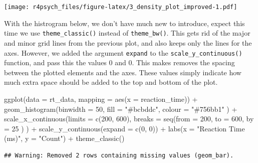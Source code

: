 \documentclass[
]{book}
\newenvironment{Shaded}{\begin{snugshade}}{\end{snugshade}}
\newcommand{\AttributeTok}[1]{\textcolor[rgb]{0.77,0.63,0.00}{#1}}
\newcommand{\DecValTok}[1]{\textcolor[rgb]{0.00,0.00,0.81}{#1}}
\newcommand{\FunctionTok}[1]{\textcolor[rgb]{0.00,0.00,0.00}{#1}}
\newcommand{\NormalTok}[1]{#1}
\newcommand{\SpecialCharTok}[1]{\textcolor[rgb]{0.00,0.00,0.00}{#1}}
\newcommand{\StringTok}[1]{\textcolor[rgb]{0.31,0.60,0.02}{#1}}
\begin{document}
\texttt{[image: r4psych\_files/figure-latex/3\_density\_plot\_improved-1.pdf]}

With the histrogram below, we don't have much new to introduce, expect this time we use \texttt{theme\_classic()} instead of \texttt{theme\_bw()}. This gets rid of the major and minor grid lines from the previous plot, and also keeps only the lines for the axes. However, we added the argument \texttt{expand} to the \texttt{scale\_y\_continuous()} function, and pass this the values 0 and 0. This makes removes the spacing between the plotted elements and the axes. These values simply indicate how much extra space should be added to the top and bottom of the plot.

\begin{Shaded}
\begin{Highlighting}[]
\FunctionTok{ggplot}\NormalTok{(}\AttributeTok{data =}\NormalTok{ rt\_data, }
       \AttributeTok{mapping =} \FunctionTok{aes}\NormalTok{(}\AttributeTok{x =}\NormalTok{ reaction\_time)) }\SpecialCharTok{+}
  \FunctionTok{geom\_histogram}\NormalTok{(}\AttributeTok{binwidth =} \DecValTok{50}\NormalTok{, }
                 \AttributeTok{fill =} \StringTok{"\#bcbddc"}\NormalTok{,}
                 \AttributeTok{colour =} \StringTok{"\#756bb1"}
\NormalTok{                 ) }\SpecialCharTok{+}
  \FunctionTok{scale\_x\_continuous}\NormalTok{(}\AttributeTok{limits =} \FunctionTok{c}\NormalTok{(}\DecValTok{200}\NormalTok{, }\DecValTok{600}\NormalTok{),}
                     \AttributeTok{breaks =} \FunctionTok{seq}\NormalTok{(}\AttributeTok{from =} \DecValTok{200}\NormalTok{, }
                                  \AttributeTok{to =} \DecValTok{600}\NormalTok{, }
                                  \AttributeTok{by =} \DecValTok{25}
\NormalTok{                                  )}
\NormalTok{                     ) }\SpecialCharTok{+}
  \FunctionTok{scale\_y\_continuous}\NormalTok{(}\AttributeTok{expand =} \FunctionTok{c}\NormalTok{(}\DecValTok{0}\NormalTok{, }\DecValTok{0}\NormalTok{)) }\SpecialCharTok{+}
  \FunctionTok{labs}\NormalTok{(}\AttributeTok{x =} \StringTok{"Reaction Time (ms)"}\NormalTok{, }\AttributeTok{y =} \StringTok{"Count"}\NormalTok{) }\SpecialCharTok{+}
  \FunctionTok{theme\_classic}\NormalTok{()}
\end{Highlighting}
\end{Shaded}

\begin{verbatim}
## Warning: Removed 2 rows containing missing values (geom_bar).
\end{verbatim}
\end{document}
